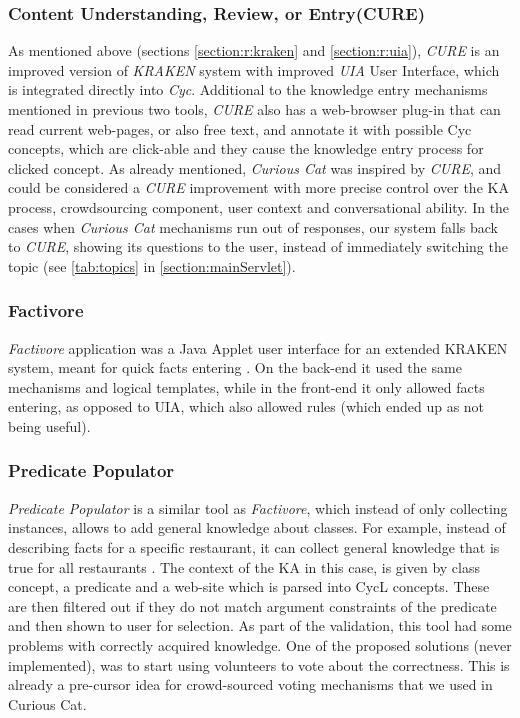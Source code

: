 \subsubsection{Content Understanding, Review, or Entry(CURE)}
\label{section:r:cure}
As mentioned above (sections \ref{section:r:kraken} and \ref{section:r:uia}),
\emph{CURE}\parencite{Witbrock2010} is an improved version of \emph{KRAKEN} 
system with improved
\emph{UIA} User Interface, which is integrated directly into \emph{Cyc}. 
Additional to the knowledge entry mechanisms mentioned in previous two tools,
\emph{CURE} also has a web-browser plug-in that can read current web-pages,
or also free text, and annotate it with possible Cyc concepts, which are
click-able and they cause the knowledge entry process for clicked concept.
As already mentioned, \emph{Curious Cat} was inspired by \emph{CURE}, and
could be considered a \emph{CURE} improvement with more precise control over the
KA process, crowdsourcing component, user context and conversational ability.
In the cases when \emph{Curious Cat} mechanisms run out of responses,
our system falls back to \emph{CURE}, showing its questions to the user, instead
of immediately switching the topic (see \autoref{tab:topics} in 
\autoref{section:mainServlet}).

\subsubsection{Factivore}
\label{section:r:factivore} 
\emph{Factivore} application was a Java Applet user interface for an extended
KRAKEN system,
meant for quick facts entering \parencite{Witbrock2005}. On the back-end it used
the same mechanisms and logical templates, while in the front-end it only
allowed facts entering, as opposed to UIA, which also allowed rules (which
ended up as not being useful).

\subsubsection{Predicate Populator}
\label{section:r:pp}
\emph{Predicate Populator} is a similar tool as \emph{Factivore}, which instead
of only collecting instances, allows to add general knowledge about classes. For
example, instead of describing facts for a specific restaurant, it can collect
general knowledge that is true for all restaurants \parencite{Witbrock2005}. The
context of the KA in this case, is given by class concept, a predicate and a 
web-site which is parsed into CycL concepts. These are then filtered out if they
do not match argument constraints of the predicate and then shown to user for 
selection. As part of the validation, this tool had some problems with correctly
acquired knowledge. One of the proposed solutions (never implemented), was to
start using volunteers to vote about the correctness. This is already a 
pre-cursor idea for crowd-sourced voting mechanisms that we used in Curious Cat.

